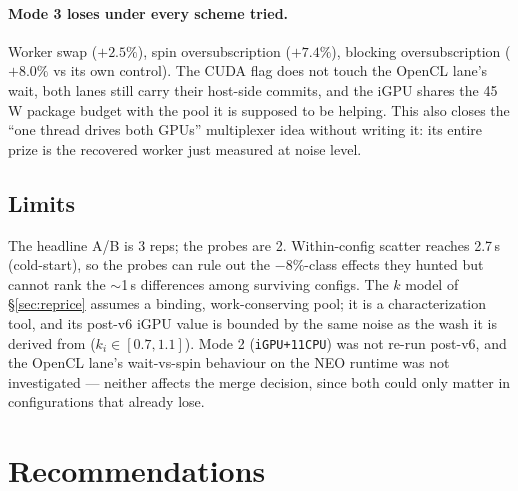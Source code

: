 \documentclass[
	english,
	letterpaper, oneside
]{article}
\begin{document}
\paragraph{Mode 3 loses under every scheme tried.} Worker swap ($+2.5\%$),
spin oversubscription ($+7.4\%$), blocking oversubscription ($+8.0\%$ vs its
own control). The CUDA flag does not touch the OpenCL lane's wait, both
lanes still carry their host-side commits, and the iGPU shares the 45\,W
package budget with the pool it is supposed to be helping. This also closes
the ``one thread drives both GPUs'' multiplexer idea without writing it: its
entire prize is the recovered worker just measured at noise level.

\subsection{Limits}

The headline A/B is 3 reps; the probes are 2. Within-config scatter reaches
2.7\,s (cold-start), so the probes can rule out the $-8\%$-class effects they
hunted but cannot rank the $\sim$1\,s differences among surviving configs.
The $k$ model of \S\ref{sec:reprice} assumes a binding, work-conserving pool;
it is a characterization tool, and its post-v6 iGPU value is bounded by the
same noise as the wash it is derived from ($k_i\in[0.7,1.1]$). Mode 2
(\texttt{iGPU+11CPU}) was not re-run post-v6, and the OpenCL lane's
wait-vs-spin behaviour on the NEO runtime was not investigated --- neither
affects the merge decision, since both could only matter in configurations
that already lose.

\section{Recommendations}
\end{document}
